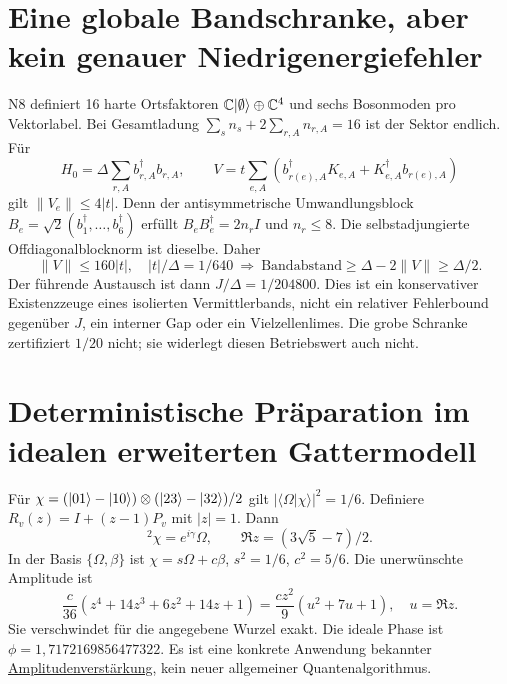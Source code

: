 \section{Eine globale Bandschranke, aber kein genauer Niedrigenergiefehler}
N8 definiert 16 harte Ortsfaktoren $\mathbb C\lvert\emptyset\rangle\oplus\mathbb C^4$ und sechs Bosonmoden pro Vektorlabel. Bei Gesamtladung $\sum_sn_s+2\sum_{r,A}n_{r,A}=16$ ist der Sektor endlich. Für
\begin{equation}
H_0=\Delta\sum_{r,A}b^\dagger_{r,A}b_{r,A},\qquad
V=t\sum_{e,A}(b^\dagger_{r(e),A}K_{e,A}+K^\dagger_{e,A}b_{r(e),A})
\end{equation}
gilt $\|V_e\|\le4|t|$. Denn der antisymmetrische Umwandlungsblock $B_e=\sqrt2(b_1^\dagger,\ldots,b_6^\dagger)$ erfüllt $B_eB_e^\dagger=2n_rI$ und $n_r\le8$. Die selbstadjungierte Offdiagonalblocknorm ist dieselbe. Daher
\begin{equation}
\|V\|\le160|t|,\quad |t|/\Delta=1/640
\ \Longrightarrow\ 
\text{Bandabstand}\ge\Delta-2\|V\|\ge\Delta/2.
\end{equation}
Der führende Austausch ist dann $J/\Delta=1/204800$. Dies ist ein konservativer Existenzzeuge eines isolierten Vermittlerbands, nicht ein relativer Fehlerbound gegenüber $J$, ein interner Gap oder ein Vielzellenlimes. Die grobe Schranke zertifiziert $1/20$ nicht; sie widerlegt diesen Betriebswert auch nicht.

\section{Deterministische Präparation im idealen erweiterten Gattermodell}
Für $\chi=(\lvert01\rangle-\lvert10\rangle)\otimes(\lvert23\rangle-\lvert32\rangle)/2$ gilt $|\langle\Omega|\chi\rangle|^2=1/6$. Definiere $R_v(z)=I+(z-1)P_v$ mit $|z|=1$. Dann
\begin{equation}
[R_\chi(z)R_\Omega(z)]^2\chi=e^{i\gamma}\Omega,\qquad
\Re z=(3\sqrt5-7)/2.
\end{equation}
In der Basis $\{\Omega,\beta\}$ ist $\chi=s\Omega+c\beta$, $s^2=1/6$, $c^2=5/6$. Die unerwünschte Amplitude ist
\begin{equation}
\frac{c}{36}(z^4+14z^3+6z^2+14z+1)
=\frac{cz^2}{9}(u^2+7u+1),\quad u=\Re z.
\end{equation}
Sie verschwindet für die angegebene Wurzel exakt. Die ideale Phase ist $\phi=1{,}7172169856477322$. Es ist eine konkrete Anwendung bekannter \href{https://arxiv.org/abs/quant-ph/0005055}{Amplitudenverstärkung}, kein neuer allgemeiner Quantenalgorithmus.

